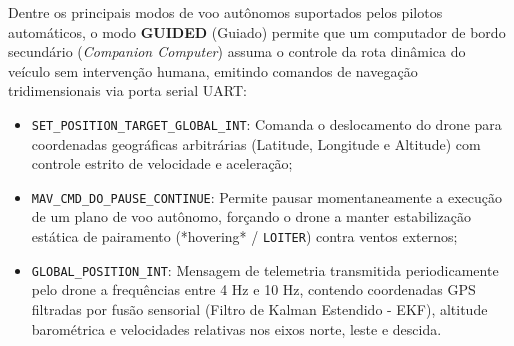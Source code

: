 Dentre os principais modos de voo autônomos suportados pelos pilotos automáticos, o modo \textbf{GUIDED} (Guiado) permite que um computador de bordo secundário (\textit{Companion Computer}) assuma o controle da rota dinâmica do veículo sem intervenção humana, emitindo comandos de navegação tridimensionais via porta serial UART:
\begin{itemize}
    \item \texttt{SET\_POSITION\_TARGET\_GLOBAL\_INT}: Comanda o deslocamento do drone para coordenadas geográficas arbitrárias (Latitude, Longitude e Altitude) com controle estrito de velocidade e aceleração;
    \item \texttt{MAV\_CMD\_DO\_PAUSE\_CONTINUE}: Permite pausar momentaneamente a execução de um plano de voo autônomo, forçando o drone a manter estabilização estática de pairamento (*hovering* / \texttt{LOITER}) contra ventos externos;
    \item \texttt{GLOBAL\_POSITION\_INT}: Mensagem de telemetria transmitida periodicamente pelo drone a frequências entre 4 Hz e 10 Hz, contendo coordenadas GPS filtradas por fusão sensorial (Filtro de Kalman Estendido - EKF), altitude barométrica e velocidades relativas nos eixos norte, leste e descida.
\end{itemize}
